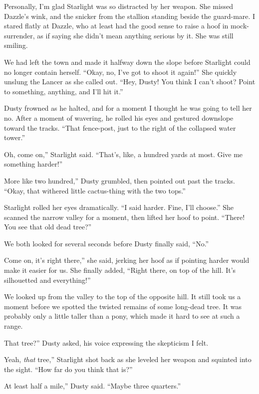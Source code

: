 Personally, I’m glad Starlight was so distracted by her weapon. She missed Dazzle’s wink, and the snicker from the stallion standing beside the guard-mare. I stared flatly at Dazzle, who at least had the good sense to raise a hoof in mock-surrender, as if saying she didn’t mean anything serious by it. She was still smiling.

We had left the town and made it halfway down the slope before Starlight could no longer contain herself. “Okay, no, I’ve got to shoot it again!” She quickly unslung the Lancer as she called out. “Hey, Dusty! You think I can’t shoot? Point to something, anything, and I’ll hit it.”

Dusty frowned as he halted, and for a moment I thought he was going to tell her no. After a moment of wavering, he rolled his eyes and gestured downslope toward the tracks. “That fence-post, just to the right of the collapsed water tower.”

\leavevmode{}Oh, come on,” Starlight said. “That’s, like, a hundred yards at most. Give me something harder!”

\leavevmode{}More like two hundred,” Dusty grumbled, then pointed out past the tracks. “Okay, that withered little cactus-thing with the two tops.”

Starlight rolled her eyes dramatically. “I said harder. Fine, I’ll choose.” She scanned the narrow valley for a moment, then lifted her hoof to point. “There! You see that old dead tree?”

We both looked for several seconds before Dusty finally said, “No.”

\leavevmode{}Come on, it’s right there,” she said, jerking her hoof as if pointing harder would make it easier for us. She finally added, “Right there, on top of the hill. It’s silhouetted and everything!”

We looked up from the valley to the top of the opposite hill. It still took us a moment before we spotted the twisted remains of some long-dead tree. It was probably only a little taller than a pony, which made it hard to see at such a range.

\leavevmode{}That tree?” Dusty asked, his voice expressing the skepticism I felt.

\leavevmode{}Yeah, \textit{that} tree,” Starlight shot back as she leveled her weapon and squinted into the sight. “How far do you think that is?”

\leavevmode{}At least half a mile,” Dusty said. “Maybe three quarters.”

